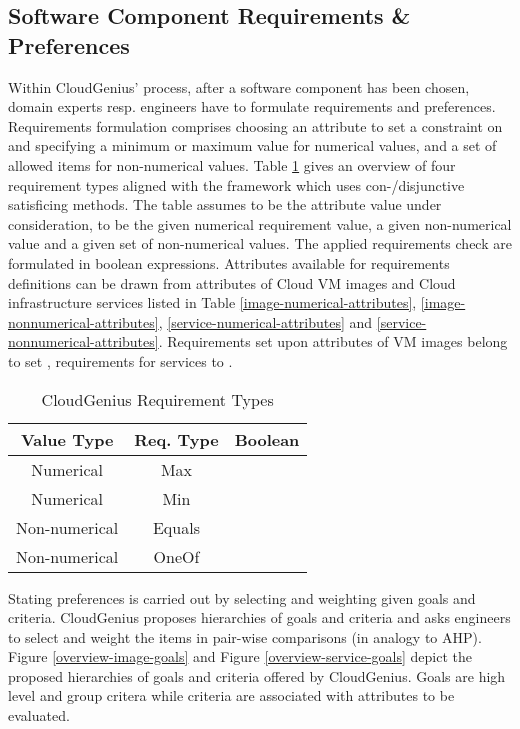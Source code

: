 \documentclass[10pt]{article}
\begin{document}
\subsection{Software Component Requirements \& Preferences}\label{sec-reqs-prefs}

Within CloudGenius' process, after a software component has been chosen, domain experts resp. engineers have to formulate requirements and preferences. Requirements formulation comprises choosing an attribute to set a constraint on and specifying a minimum or maximum value for numerical values, and a set of allowed items for non-numerical values. Table \ref{requirement-types} gives an overview of four requirement types aligned with the  framework which uses con-/disjunctive satisficing methods. The table assumes  to be the attribute value under consideration,  to be the given numerical requirement value,  a given non-numerical value and  a given set of non-numerical values. The applied requirements check are formulated in boolean expressions.
Attributes available for requirements definitions can be drawn from attributes of Cloud VM images and Cloud infrastructure services listed in Table \ref{image-numerical-attributes}, \ref{image-nonnumerical-attributes}, \ref{service-numerical-attributes} and \ref{service-nonnumerical-attributes}. Requirements set upon attributes of VM images belong to set , requirements for services to .

\begin{table}
\centering
\caption{CloudGenius Requirement Types}\label{requirement-types}
\begin{tabular}{|c|c|l|} \hline
Value Type&Req. Type&Boolean\\ \hline
Numerical&Max&\\
Numerical&Min&\\
Non-numerical&Equals&\\
Non-numerical&OneOf&\\
\hline\end{tabular}
\end{table}


Stating preferences is carried out by selecting and weighting given goals and criteria. CloudGenius proposes hierarchies of goals and criteria and asks engineers to select and weight the items in pair-wise comparisons (in analogy to AHP). Figure \ref{overview-image-goals} and Figure \ref{overview-service-goals} depict the proposed hierarchies of goals and criteria offered by CloudGenius. Goals are high level and group critera while criteria are associated with attributes to be evaluated.  
\end{document}
